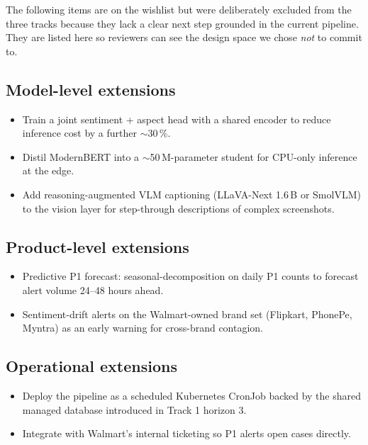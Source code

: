 The following items are on the wishlist but were deliberately excluded
from the three tracks because they lack a clear next step grounded in
the current pipeline.  They are listed here so reviewers can see the
design space we chose \emph{not} to commit to.

\subsection*{Model-level extensions}
\begin{itemize}
\item Train a joint sentiment + aspect head with a shared encoder to
      reduce inference cost by a further $\sim$30\,\%.
\item Distil ModernBERT into a $\sim$50\,M-parameter student for
      CPU-only inference at the edge.
\item Add reasoning-augmented VLM captioning (LLaVA-Next 1.6\,B or
      SmolVLM) to the vision layer for step-through descriptions of
      complex screenshots.
\end{itemize}

\subsection*{Product-level extensions}
\begin{itemize}
\item Predictive P1 forecast: seasonal-decomposition on daily P1
      counts to forecast alert volume 24--48 hours ahead.
\item Sentiment-drift alerts on the Walmart-owned brand set
      (Flipkart, PhonePe, Myntra) as an early warning for
      cross-brand contagion.
\end{itemize}

\subsection*{Operational extensions}
\begin{itemize}
\item Deploy the pipeline as a scheduled Kubernetes CronJob backed by
      the shared managed database introduced in Track 1 horizon 3.
\item Integrate with Walmart's internal ticketing so P1 alerts open
      cases directly.
\end{itemize}
